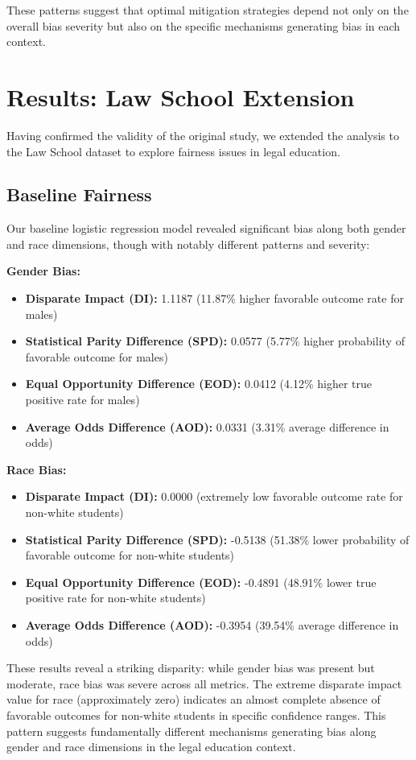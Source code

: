 \documentclass[10pt,journal,compsoc]{IEEEtran}
\begin{document}
These patterns suggest that optimal mitigation strategies depend not only on the overall bias severity but also on the specific mechanisms generating bias in each context.

\section{Results: Law School Extension}
Having confirmed the validity of the original study, we extended the analysis to the Law School dataset to explore fairness issues in legal education.

\subsection{Baseline Fairness}
Our baseline logistic regression model revealed significant bias along both gender and race dimensions, though with notably different patterns and severity:

\textbf{Gender Bias:}
\begin{itemize}
\item \textbf{Disparate Impact (DI):} 1.1187 (11.87\% higher favorable outcome rate for males)
\item \textbf{Statistical Parity Difference (SPD):} 0.0577 (5.77\% higher probability of favorable outcome for males)
\item \textbf{Equal Opportunity Difference (EOD):} 0.0412 (4.12\% higher true positive rate for males)
\item \textbf{Average Odds Difference (AOD):} 0.0331 (3.31\% average difference in odds)
\end{itemize}

\textbf{Race Bias:}
\begin{itemize}
\item \textbf{Disparate Impact (DI):} 0.0000 (extremely low favorable outcome rate for non-white students)
\item \textbf{Statistical Parity Difference (SPD):} -0.5138 (51.38\% lower probability of favorable outcome for non-white students)
\item \textbf{Equal Opportunity Difference (EOD):} -0.4891 (48.91\% lower true positive rate for non-white students)
\item \textbf{Average Odds Difference (AOD):} -0.3954 (39.54\% average difference in odds)
\end{itemize}

These results reveal a striking disparity: while gender bias was present but moderate, race bias was severe across all metrics. The extreme disparate impact value for race (approximately zero) indicates an almost complete absence of favorable outcomes for non-white students in specific confidence ranges. This pattern suggests fundamentally different mechanisms generating bias along gender and race dimensions in the legal education context.
\end{document}
